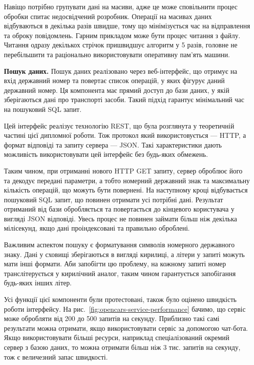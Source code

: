 Навіщо потрібно групувати дані на масиви,
адже це може сповільнити процес обробки спитає недосвідчений розробник.
Операції на масивах даних відбуваються в декілька разів швидше, тому що мінімізується час на відправлення та оброку повідомлень.
Гарним прикладом може бути процес читання з файлу.
Читання одразу декількох стрічок пришвидшує алгоритм у 5 разів,
головне не перебільшити та раціонально використовувати оперативну пам'ять машини.

\textbf{Пошук даних.}
Пошук даних реалізовано через веб-інтерфейс, що отримує на вхід державний номер та
повертає список операцій, у яких фігурує даний державний номер.
Ця компонента має прямий доступ до бази даних, у якій зберігаються дані про транспорті засоби.
Такий підхід гарантує мінімальний час на пошуковий SQL запит.

Цей інтерфейс реалізує технологію REST, що була розглянута у теоретичній частині цієї дипломної роботи.
Тож протокол який використовується — HTTP, а формат відповіді та запиту сервера — JSON.
Такі характеристики дають можливість використовувати
цей інтерфейс без будь-яких обмежень.

Таким чином, при отриманні нового HTTP GET запиту, сервер оброблює його та декодує
передані параметри, а тобто номерний державний знак та максимальну кількість операцій, що можуть бути повернені.
На наступному кроці відбувається пошуковий SQL запит, що повинен отримати усі потрібні дані.
Результат отриманий від бази обробляється та повертається до кінцевого користувача у вигляді JSON відповіді.
Увесь процес не повинен займати більш ніж декілька мілісекунд,
якщо дані проіндексовані та правильно оброблені.

Важливим аспектом пошуку є форматування символів номерного державного знаку.
Дані у сховищі зберігаються в вигляді кирилиці, а літери у запиті можуть мати інші формати.
Аби запобігти цю проблему, на кожному запиті номер транслітерується у кирилічний аналог,
таким чином гарантується запобігання будь-яких інших літер.

Усі функції цієї компоненти були протестовані, також було оцінено швидкість роботи інтерфейсу.
На рис.~\ref{fig:opencars-service-performance} бачимо,
що сервіс може обробляти від 200 до 500 запитів на секунду.
Приблизно такі самі результати можна отримати,
якщо використовувати сервіс за допомогою чат-бота.
Якщо використовувати більші ресурси, наприклад спеціалізований
окремий сервер з базою даних, то можна отримати більш ніж
3 тис. запитів на секунду, тож є величезний запас швидкості.

